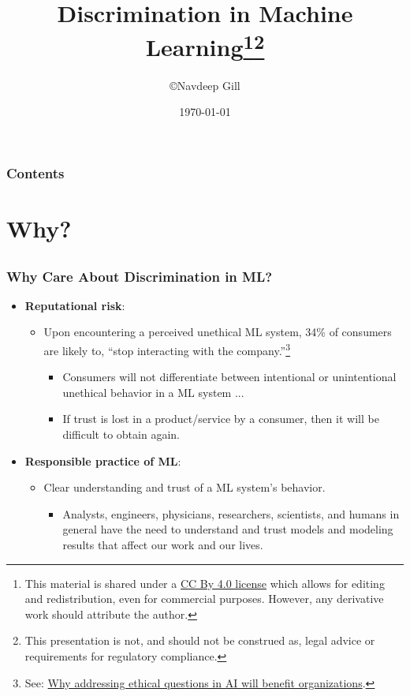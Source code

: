\documentclass[11pt,
               		aspectratio=169,
               		hyperref={colorlinks}
               		]{beamer}
\author{\copyright\hspace{1pt}Navdeep Gill}
\title{Discrimination in Machine Learning\footnote{\tiny{This material is shared under a \href{https://creativecommons.org/licenses/by/4.0/deed.ast}{CC By 4.0 license} which allows for editing and redistribution, even for commercial purposes. However, any derivative work should attribute the author.}}\footnote{\tiny{This presentation is not, and should not be construed as, legal advice or requirements for regulatory compliance.}}}
\subtitle{\scriptsize{}}
\date{\today}
\begin{document}
	\maketitle
	\begin{frame}
		\frametitle{Contents}
		\tableofcontents{}
	\end{frame}
	\section{Why?}
		\subsection*{}
		\begin{frame}				
			\frametitle{Why Care About Discrimination in ML?}
			\begin{itemize}
				\Large
				\item \textbf{Reputational risk}: 
  			  \begin{itemize}
  			    \item {Upon encountering a perceived unethical ML system, 34\% of consumers are likely to, ``stop interacting with the company.''\footnote{\scriptsize{See: \href{https://www      .capgemini.com/research/why-addressing-ethical-questions-in-ai-will-benefit-organizations/}{Why addressing ethical questions in AI will benefit organizations}.}}}
  			      \begin{itemize}
  			        \item \tiny{Consumers will not differentiate between intentional or unintentional unethical behavior in a ML system ...}
  			        \item \tiny{If trust is lost in a product/service by a consumer, then it will be difficult to obtain again.}
  			      \end{itemize}
  			  \end{itemize}
				\item \textbf{Responsible practice of ML}:
  				\begin{itemize}
  				  \item {Clear understanding and trust of a ML system's behavior.}
  				    \begin{itemize}
      				  \item \tiny{Analysts, engineers, physicians, researchers, scientists, and humans in general have the need to understand and trust models and modeling results that affect our work and our lives.}

\end{itemize}
\end{itemize}
\end{itemize}
\end{frame}
\end{document}
